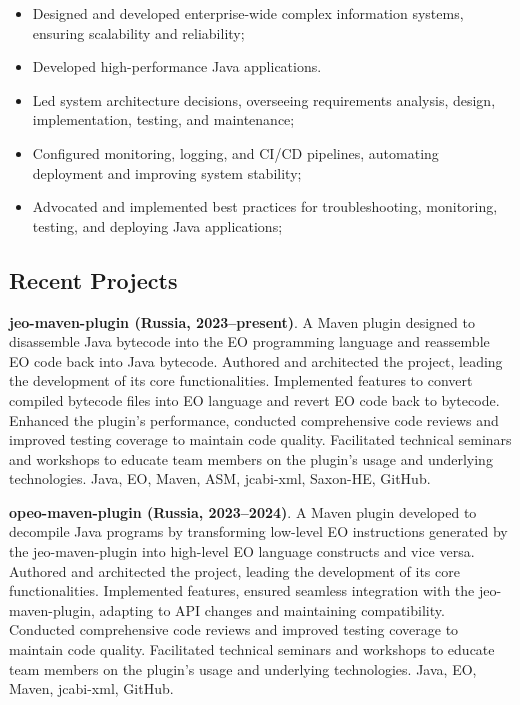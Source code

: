 \documentclass{vl}
\begin{document}
    \begin{itemize}
        \itemsep0em
        \item Designed and developed enterprise-wide complex information systems, ensuring scalability and reliability;
        \item Developed high-performance Java applications.
        \item Led system architecture decisions, overseeing requirements analysis, design, implementation, testing,
        and maintenance;
        \item Configured monitoring, logging, and CI/CD pipelines, automating deployment and improving system stability;
        \item Advocated and implemented best practices for troubleshooting, monitoring, testing, and deploying
        Java applications;
    \end{itemize}

    \subsection*{Recent Projects}

    \textbf{jeo-maven-plugin (Russia, 2023--present)}.
    A Maven plugin designed to disassemble Java bytecode into the EO programming language and reassemble EO code back
    into Java bytecode.
    Authored and architected the project, leading the development of its core functionalities.
    Implemented features to convert compiled bytecode files into EO language and revert EO code back to bytecode.
    Enhanced the plugin's performance, conducted comprehensive code reviews and improved testing coverage to maintain
    code quality.
    Facilitated technical seminars and workshops to educate team members on the plugin's usage and underlying
    technologies.
    Java, EO, Maven, ASM, jcabi-xml, Saxon-HE, GitHub.

    \textbf{opeo-maven-plugin (Russia, 2023--2024)}.
    A Maven plugin developed to decompile Java programs by transforming low-level EO instructions
    generated by the jeo-maven-plugin into high-level EO language constructs and vice versa.
    Authored and architected the project, leading the development of its core functionalities.
    Implemented features, ensured seamless integration with the jeo-maven-plugin, adapting to API changes and
    maintaining compatibility.
    Conducted comprehensive code reviews and improved testing coverage to maintain code quality.
    Facilitated technical seminars and workshops to educate team members on the plugin's usage and underlying
    technologies.
    Java, EO, Maven, jcabi-xml, GitHub.
\end{document}
